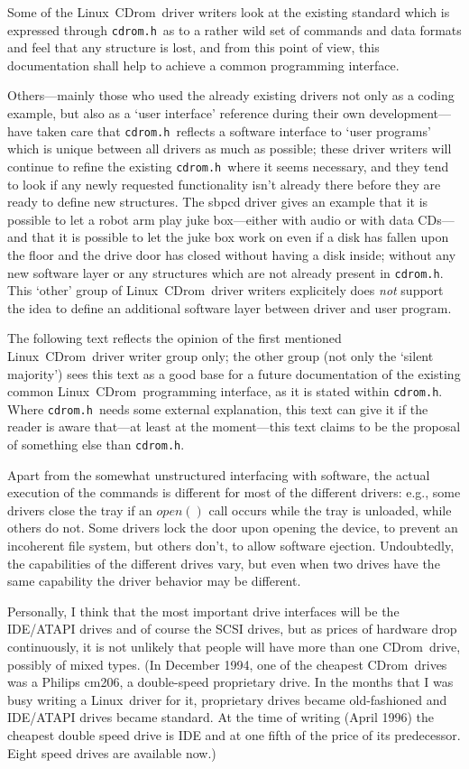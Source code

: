 \documentclass{article}
\def\linux{{\sc Linux}}
\def\cdrom{{\sc CDrom}}
\def\cdromh{{\tt cdrom.h}}
\begin{document}
Some of the \linux\ \cdrom\ driver writers look at the existing standard
which is expressed through \cdromh\ as to a rather wild set of
commands and data formats and feel that any structure is lost, and from
this point of view, this documentation shall help to achieve a common
programming interface.
 
Others---mainly those who used the already existing drivers not only
as a coding example, but also as a `user interface' reference during
their own development---have taken care that \cdromh\ reflects a
software interface to `user programs' which is unique between all
drivers as much as possible; these driver writers will continue to
refine the existing \cdromh\ where it seems necessary, and they tend
to look if any newly requested functionality isn't already there
before they are ready to define new structures. The sbpcd driver gives
an example that it is possible to let a robot arm play juke
box---either with audio or with data CDs---and that it is possible to
let the juke box work on even if a disk has fallen upon the floor and
the drive door has closed without having a disk inside; without any
new software layer or any structures which are not already present in
\cdromh.  This `other' group of \linux\ \cdrom\ driver writers
explicitely does {\em not\/} support the idea to define an additional
software layer between driver and user program.

The following text reflects the opinion of the first mentioned \linux\ 
\cdrom\ driver writer group only; the other group (not only the `silent
majority') sees this text as a good base for a future documentation of the
existing common \linux\ \cdrom\ programming interface, as it is stated 
within \cdromh. Where \cdromh\ needs some external 
explanation, this text can give it if the reader is aware that---at least
at the moment---this text claims to be the proposal of something else than
\cdromh.


Apart from the somewhat unstructured interfacing with software, the
actual execution of the commands is different for most of the
different drivers: e.g., some drivers close the tray if an $open()$ call
occurs while the tray is unloaded, while others do not. Some drivers lock the
door upon opening the device, to prevent an incoherent file system,
but others don't, to allow software ejection. Undoubtedly, the
capabilities of the different drives vary, but even when two drives have
the same capability the driver behavior may be different. 

Personally, I think that the most important drive interfaces will be
the IDE/ATAPI drives and of course the SCSI drives, but as prices of
hardware drop continuously, it is not unlikely that people will have
more than one \cdrom\ drive, possibly of mixed types.  (In December
1994, one of the cheapest \cdrom\ drives was a Philips cm206, a
double-speed proprietary drive. In the months that I was busy writing
a \linux\ driver for it, proprietary drives became old-fashioned and
IDE/ATAPI drives became standard. At the time of writing (April 1996)
the cheapest double speed drive is IDE and at one fifth of the price
of its predecessor. Eight speed drives are available now.)
\end{document}
